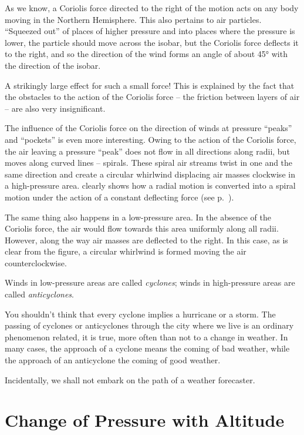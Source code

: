 As we know, a Coriolis force directed to the right of the motion acts on any body moving in the Northern Hemisphere. This also pertains to air particles. ``Squeezed out'' of places of higher pressure and into places where the pressure is lower, the particle should move across the isobar, but the Coriolis force deflects it to the right, and so the direction of the wind forms an angle of about \ang{45} with the direction of the isobar.

A strikingly large effect for such a small force! This is explained by the fact that the obstacles to the action of the Coriolis force -- the friction between layers of air -- are also very insignificant.

The influence of the Coriolis force on the direction of winds at pressure ``peaks'' and ``pockets'' is even more interesting. Owing to the action of the Coriolis force, the air leaving a pressure ``peak'' does not flow in all directions along radii, but moves along curved lines -- spirals. These spiral air streams twist in one and the same direction and create a circular whirlwind displacing air masses clockwise in a high-pressure area.  clearly shows how a radial motion is converted into a spiral motion under the action of a constant deflecting force (see p.~\pageref{fig-2.16}).

The same thing also happens in a low-pressure area. In the absence of the Coriolis force, the air would flow towards this area uniformly along all radii. However, along the way air masses are deflected to the right. In this case, as is clear from the figure, a circular whirlwind is formed moving the air counterclockwise.

Winds in low-pressure areas are called \emph{cyclones}; winds in high-pressure areas are called \emph{anticyclones}. 

You shouldn't think that every cyclone implies a hurricane or a storm. The passing of cyclones or anticyclones through the city where we live is an ordinary phenomenon related, it is true, more often than not to a change in weather. In many cases, the approach of a cyclone means the coming of bad weather, while the approach of an anticyclone the coming of good weather. 

Incidentally, we shall not embark on the path of a weather forecaster.

\section{Change of Pressure with Altitude}


